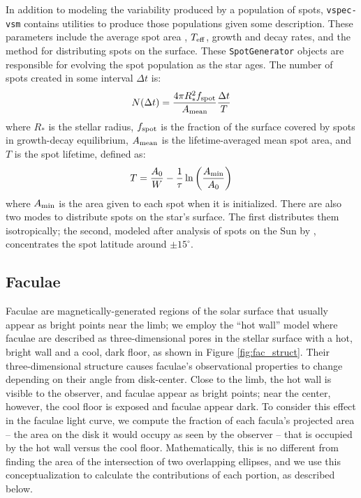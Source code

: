 \documentclass[linenumbers,preprint,authoryear]{elsarticle}
\newcommand{\teff}{$T_{\rm eff}$}
\begin{document}
In addition to modeling the variability produced by a population of spots, \texttt{vspec-vsm} contains utilities to produce those populations given some description.
These parameters include the average spot area \citep[lognormally distributed, ][]{bogdan1988}, \teff, growth and decay rates, and the method for distributing spots on the surface. These \texttt{SpotGenerator} objects are responsible for evolving the spot population as the star ages. The number of spots created in some interval $\Delta t$ is:
\begin{equation}
    N(\Delta t) = \frac{4 \pi R_*^2 f_{\rm spot}}{A_{\rm mean}} \frac{\Delta t}{T}
\end{equation}
where $R_*$ is the stellar radius, $f_{\rm spot}$ is the fraction of the surface covered by spots in growth-decay equilibrium, $A_{\rm mean}$ is the lifetime-averaged mean spot area, and $T$ is the spot lifetime, defined as:
\begin{equation}
    T = \frac{A_0}{W} - \frac{1}{\tau} \ln{\left (\frac{A_{\rm min}}{A_0}\right )}
\end{equation}
where $A_{\rm min}$ is the area given to each spot when it is initialized. There are also two modes to distribute spots on the star's surface. The first distributes them isotropically; the second, modeled after analysis of spots on the Sun by \citet{mandal2017}, concentrates the spot latitude around $\pm 15^{\circ}$.


\subsection{Faculae \label{subsec:faculae}}
Faculae are magnetically-generated regions of the solar surface that usually appear as bright points near the limb; we employ the ``hot wall''
model \citep{spruit1976} where faculae are described as three-dimensional pores in the stellar surface with a hot, bright wall and a cool, dark floor, as shown in Figure \ref{fig:fac_struct}. Their three-dimensional structure causes faculae's observational properties to change depending on their angle from disk-center. Close to the limb,
the hot wall is visible to the observer, and faculae appear as bright points; near the center, however, the cool floor is exposed and faculae appear dark. To consider this effect in the faculae light curve, we compute the fraction of each facula's projected area -- the area on the disk it would occupy as seen by the observer -- that is occupied by the hot wall versus the cool floor. Mathematically, this is no different from finding the area of the intersection of two overlapping ellipses, and we use this conceptualization to calculate the contributions of each portion, as described below.
\end{document}

